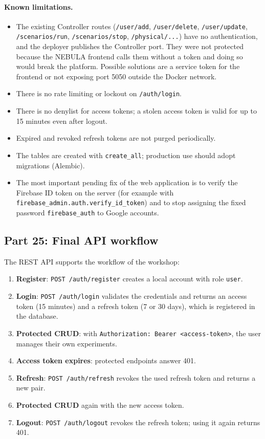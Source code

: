 \documentclass[9pt,a4paper,twocolumn]{article}
\begin{document}
\paragraph{Known limitations.}
\begin{itemize}
    \item The existing Controller routes (\texttt{/user/add}, \texttt{/user/delete}, \texttt{/user/update}, \texttt{/scenarios/run}, \texttt{/scenarios/stop}, \texttt{/physical/...}) have no authentication, and the deployer publishes the Controller port. They were not protected because the NEBULA frontend calls them without a token and doing so would break the platform. Possible solutions are a service token for the frontend or not exposing port 5050 outside the Docker network.
    \item There is no rate limiting or lockout on \texttt{/auth/login}.
    \item There is no denylist for access tokens; a stolen access token is valid for up to 15 minutes even after logout.
    \item Expired and revoked refresh tokens are not purged periodically.
    \item The tables are created with \texttt{create\_all}; production use should adopt migrations (Alembic).
    \item The most important pending fix of the web application is to verify the Firebase ID token on the server (for example with \texttt{firebase\_admin.auth.verify\_id\_token}) and to stop assigning the fixed password \texttt{firebase\_auth} to Google accounts.
\end{itemize}

\subsection{Part 25: Final API workflow}

The REST API supports the workflow of the workshop:

\begin{enumerate}
    \item \textbf{Register}: \texttt{POST /auth/register} creates a local account with role \texttt{user}.
    \item \textbf{Login}: \texttt{POST /auth/login} validates the credentials and returns an access token (15 minutes) and a refresh token (7 or 30 days), which is registered in the database.
    \item \textbf{Protected CRUD}: with \texttt{Authorization: Bearer <access-token>}, the user manages their own experiments.
    \item \textbf{Access token expires}: protected endpoints answer 401.
    \item \textbf{Refresh}: \texttt{POST /auth/refresh} revokes the used refresh token and returns a new pair.
    \item \textbf{Protected CRUD} again with the new access token.
    \item \textbf{Logout}: \texttt{POST /auth/logout} revokes the refresh token; using it again returns 401.
\end{enumerate}
\end{document}
